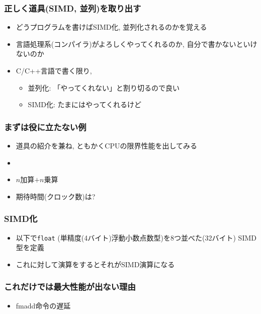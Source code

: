 \documentclass[10pt,dvipdfmx]{beamer}
\begin{document}
\begin{frame}
  \frametitle{正しく道具(SIMD, 並列)を取り出す}
  \begin{itemize}
  \item どうプログラムを書けばSIMD化, 並列化されるのかを覚える
  \item 言語処理系(コンパイラ)がよろしくやってくれるのか,
    自分で書かないといけないのか

  \item C/C++言語で書く限り,
    \begin{itemize}
    \item 並列化: 「やってくれない」と割り切るので良い
    \item SIMD化: たまにはやってくれるけど
    \end{itemize}
  \end{itemize}
\end{frame}

\begin{frame}[fragile]
\frametitle{まずは役に立たない例}
\begin{itemize}
\item 道具の紹介を兼ね, ともかくCPUの限界性能を出してみる
\item []
  
\item $n$加算$+n$乗算
\item 期待時間(クロック数)は?
\end{itemize}
\end{frame}

\begin{frame}[fragile]
\frametitle{SIMD化}
\begin{itemize}
\item 以下で\texttt{float} (単精度(4バイト)浮動小数点数型)を8つ並べた(32バイト)
  SIMD型を定義
  
\item これに対して演算をするとそれがSIMD演算になる
  
\end{itemize}
\end{frame}

\begin{frame}
\frametitle{これだけでは最大性能が出ない理由}
\begin{itemize}
\item fmadd命令の遅延
\end{itemize}
\end{frame}
\end{document}
